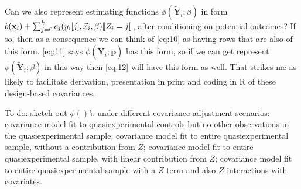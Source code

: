 \documentclass{article}
\DeclarePairedDelimiter{\indicator}{\llbracket}{\rrbracket}
\begin{document}
Can we also represent estimating functions
$\phi(\tilde{\mathbf{Y}}_{i}; \beta)$ in form
$b(\mathbf{x}_{i}) + \sum_{j=0}^{k}c_{j}(y_{i}[j], \vec{x}_{i}, \beta)\indicator{Z_{i}=j}$, after conditioning
on potential outcomes? If so, then as a consequence we can think of
\eqref{eq:10} as having rows that are also of this form.
\eqref{eq:11} says $\tilde{\phi}(\tilde{\mathbf{Y}}_{i}; \mathbf{p})$
has this form, so if we can get represent
$\phi(\tilde{\mathbf{Y}}_{i}; \beta)$ in this way then \eqref{eq:12}
will have this form as well. That strikes me as likely to facilitate
derivation, 
presentation in print and coding in R of these design-based covariances. 

To do:
sketch out $\phi()$'s under different covariance adjustment scenarios:
covariance model fit to quasiexperimental controls but no other
observations in the quasiexperimental sample; covariance model fit to
entire quasiexperimental sample, without a contribution from $Z$;
covariance model fit to entire quasiexperimental sample, with linear
contribution from $Z$; covariance model fit to entire
quasiexperimental sample with a $Z$ term and also $Z$-interactions
with covariates.

\end{document}
